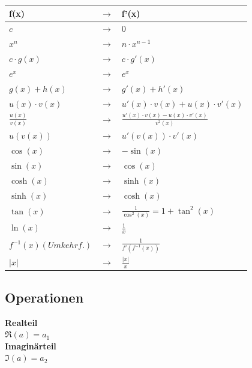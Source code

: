 {\setlength{\extrarowheight}{4pt}
	\begin{tabular}{@{}lcl@{}}
		\textbf{f(x)} & $\rightarrow$ & \textbf{f'(x)} \\
		\toprule
		$c$ & $\rightarrow$ & $0$ \\
		$x^n$  & $\rightarrow$ & $n\cdot x^{n-1}$ \\
		$c\cdot g\left(x\right)$  & $\rightarrow$ & $c\cdot g'\left(x\right)$ \\
		$e^x$  & $\rightarrow$ & $e^x$ \\
		\midrule
		$g\left(x\right)+h\left(x\right)$  & $\rightarrow$ & $g'\left(x\right)+h'\left(x\right)$ \\
		$u\left(x\right)\cdot v\left(x\right)$  & $\rightarrow$ & $u'\left(x\right)\cdot v\left(x\right)+u\left(x\right)\cdot v'\left(x\right)$ \\ 
		$\frac{u\left(x\right)}{v\left(x\right)}$  & $\rightarrow$ & $\frac{u'\left(x\right)\cdot v\left(x\right)-u\left(x\right)\cdot v'\left(x\right)}{v^2\left(x\right)}$ \\
		$u\left(v\left(x\right)\right)$  & $\rightarrow$ & $u'\left(v\left(x\right)\right)\cdot v'\left(x\right)$ \\
		\midrule
		$\cos\left(x\right)$ & $\rightarrow$ & $-\sin(x)$ \\
		$\sin\left(x\right)$ & $\rightarrow$ & $\cos(x)$ \\	
		$\cosh\left(x\right)$ & $\rightarrow$ & $\sinh(x)$ \\
		$\sinh\left(x\right)$ & $\rightarrow$ & $\cosh(x)$ \\
		$\tan\left(x\right)$ & $\rightarrow$ & $\frac{1}{\cos^2(x)} = 1 + \tan^2(x)$ \\	
		$\ln\left(x\right)$ & $\rightarrow$ & $\frac{1}{x}$ \\
		$f^{-1}\left(x\right) {\scriptscriptstyle (Umkehrf.)}$  & $\rightarrow$ & $\frac{1}{f'(f^{-1}(x))}$ \\
		$\left|x\right|$ & $\rightarrow$ & $\frac{\left|x\right|}{x}$ \\
	\end{tabular}
}

\newpage
\subsection{Operationen}
\noindent\textbf{Realteil}\\
$\Re(a) = a_1$\\

\noindent\textbf{Imaginärteil}\\
$\Im(a) = a_2$\\

